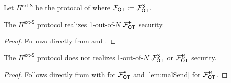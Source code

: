 \iffullversion

\begin{definition}\label{def:ext_S_U}
	Let $\Pi^{\textsf{ext-S}}$ be the protocol of  where $\mathcal{F}_{\mathsf{OT}}:=\mathcal{F}_{\mathsf{OT}}^\mathsf{S}$.
\end{definition}
\begin{lemma}
	The $\Pi^\textsf{ext-S}$ protocol realizes 1-out-of-$N$ $\mathcal{F}_{\mathsf{OT}}^\mathsf{E}$ security.
\end{lemma}
\begin{proof}
	Follows directly from  and .
\end{proof}
\begin{lemma}
		The $\Pi^\textsf{ext-S}$ protocol does not realizes 1-out-of-$N$ $\mathcal{F}_{\mathsf{OT}}^\mathsf{S}$ or $\mathcal{F}_{\mathsf{OT}}^\mathsf{R}$ security.
\end{lemma}
\begin{proof}
	Follows directly from  with  for $\mathcal{F}_{\mathsf{OT}}^\mathsf{S}$ and \ref{lem:malSend} for $\mathcal{F}_{\mathsf{OT}}^\mathsf{R}$.
\end{proof}
\fi



